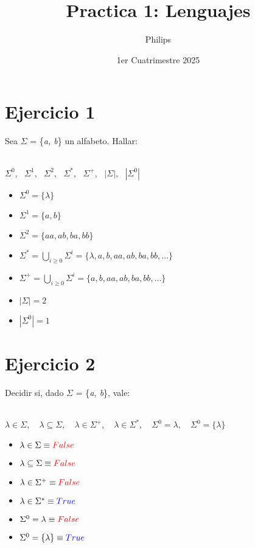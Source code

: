 \documentclass[12pt]{article}
\title{Practica 1: Lenguajes}
\author{Philips}
\date{1er Cuatrimestre 2025} %
\begin{document}
\maketitle %

\section*{Ejercicio 1}
Sea $\Sigma$ = \{\textit{a, b}\} un alfabeto. Hallar:
\\
\\
\centerline{$\Sigma^0,\ \ \ \Sigma^1,\ \ \ \Sigma^2,\ \ \ \Sigma^*,\ \ \ \Sigma^+,\ \ \ |\Sigma|,\ \ \ |\Sigma^0|$}

\begin{itemize}
    \item $\Sigma^0 = \{\lambda\}$
    \item $\Sigma^1 = \{a,b\}$
    \item $\Sigma^2 = \{aa,ab,ba,bb\}$
    \item $\Sigma^* = \bigcup\limits_{i\geq0}\Sigma^i=\{\lambda,a,b,aa,ab,ba,bb,...\}$
    \item $\Sigma^+ = \bigcup\limits_{i\geq0}\Sigma^i=\{a,b,aa,ab,ba,bb,...\}$
    \item $|\Sigma| = 2$
    \item $|\Sigma^0| = 1$
\end{itemize}

\section*{Ejercicio 2}
Decidir si, dado $\Sigma$ = \{\textit{a, b}\}, vale:
\\
\\
\centerline{\(\lambda \in \Sigma, \quad \lambda \subseteq \Sigma, \quad \lambda \in \Sigma^+, \quad \lambda \in \Sigma^*, \quad \Sigma^0 = \lambda, \quad \Sigma^0 = \{\lambda\}\)}

\begin{itemize}
    \item  $\lambda \in \Sigma \equiv \textcolor{red}{False}$
    \item  $\lambda \subseteq \Sigma \equiv \textcolor{red}{False}$
    \item  $\lambda \in \Sigma^+ \equiv \textcolor{red}{False}$
    \item  $\lambda \in \Sigma^* \equiv \textcolor{blue}{True}$
    \item  $\Sigma^0 = \lambda \equiv \textcolor{red}{False}$
    \item  $\Sigma^0 = \{\lambda\} \equiv \textcolor{blue}{True}$
\end{itemize}
\end{document}
